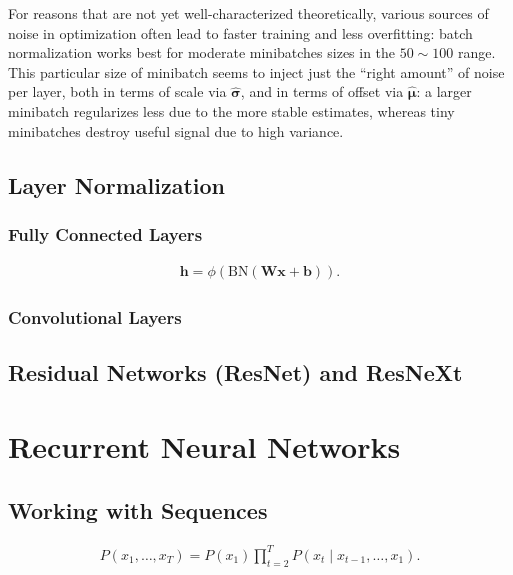 \documentclass[a4paper,12pt]{article}
\theoremstyle{definition}
\begin{document}
For reasons that are not yet well-characterized theoretically, various sources of noise in optimization often lead to faster training and less overfitting:
batch normalization works best for moderate minibatches sizes in the $50 \sim 100$
range. This particular size of minibatch seems to inject just the “right amount” of noise per layer, both in terms of scale via $\hat{\boldsymbol{\sigma}}$, and in terms of offset
via $\hat{\boldsymbol{\mu}}$: a larger minibatch regularizes less due to the more stable estimates, whereas tiny minibatches destroy useful signal due to high variance.

\subsection*{Layer Normalization}

\subsubsection*{Fully Connected Layers}
\begin{equation*}
    \begin{aligned}
        \mathbf{h} = \phi(\mathrm{BN}(\mathbf{W}\mathbf{x} + \mathbf{b}) ).
    \end{aligned}
\end{equation*}

\subsubsection*{Convolutional Layers}


\subsection*{Residual Networks (ResNet) and ResNeXt}
\section{Recurrent Neural Networks}
\subsection{Working with Sequences}

\begin{equation*}
    \begin{aligned}
        P(x_1, \ldots, x_T) = P(x_1) \prod_{t=2}^T P(x_t \mid x_{t-1}, \ldots, x_1).
    \end{aligned}
\end{equation*}
\end{document}
